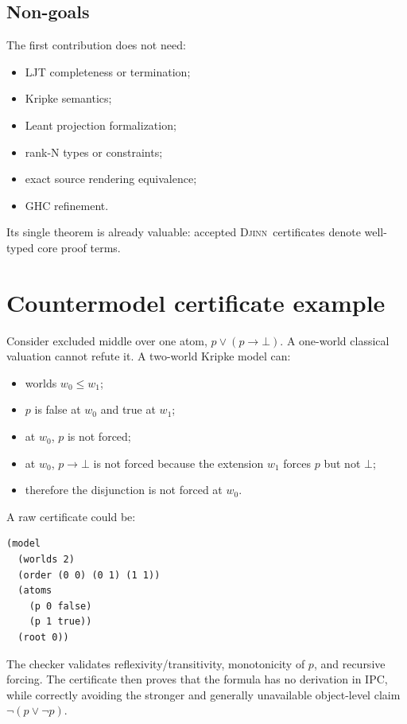 \documentclass[11pt,letterpaper,openany]{report}
\theoremstyle{definition}
\theoremstyle{remark}
\newcommand{\Djinn}{\textsc{Djinn}}
\begin{document}
\section{Non-goals}

The first contribution does not need:

\begin{itemize}
\item LJT completeness or termination;
\item Kripke semantics;
\item Leant projection formalization;
\item rank-N types or constraints;
\item exact source rendering equivalence;
\item GHC refinement.
\end{itemize}

Its single theorem is already valuable: accepted \Djinn\ certificates denote well-typed core proof terms.

\chapter{Countermodel certificate example}
\label{app:countermodel}

Consider excluded middle over one atom, \(p\lor(p\to\bot)\). A one-world classical valuation cannot refute it. A two-world Kripke model can:

\begin{itemize}
\item worlds \(w_0\le w_1\);
\item \(p\) is false at \(w_0\) and true at \(w_1\);
\item at \(w_0\), \(p\) is not forced;
\item at \(w_0\), \(p\to\bot\) is not forced because the extension \(w_1\) forces \(p\) but not \(\bot\);
\item therefore the disjunction is not forced at \(w_0\).
\end{itemize}

A raw certificate could be:

\begin{lstlisting}[caption={Illustrative countermodel payload.}]
(model
  (worlds 2)
  (order (0 0) (0 1) (1 1))
  (atoms
    (p 0 false)
    (p 1 true))
  (root 0))
\end{lstlisting}

The checker validates reflexivity/transitivity, monotonicity of \(p\), and recursive forcing. The certificate then proves that the formula has no derivation in IPC, while correctly avoiding the stronger and generally unavailable object-level claim \(\neg(p\lor\neg p)\).
\end{document}
